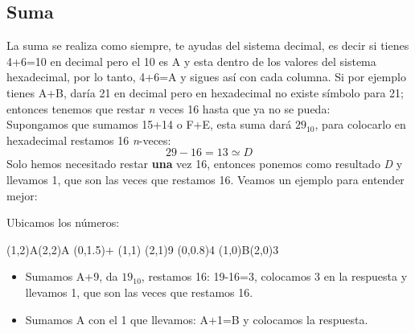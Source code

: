 \documentclass[
	12pt, %
	fleqn, %
	a4paper, %
]{LegrandOrangeBook}
\begin{document}
\subsection{Suma}
La suma se realiza como siempre, te ayudas del sistema decimal, es decir si tienes 4+6=10 en decimal pero el 10 es A y esta dentro de los valores del sistema hexadecimal, por lo tanto, 4+6=A y sigues así con cada columna. Si por ejemplo tienes  A+B, daría 21 en decimal pero en hexadecimal no existe símbolo para 21; entonces tenemos que restar \textit{n} veces 16 hasta que ya no se pueda:\\
Supongamos que sumamos 15+14 o F+E, esta suma dará $29_{10}$, para colocarlo en hexadecimal restamos 16 \textit{n}-veces:
\begin{displaymath}
29-16=13\simeq D
\end{displaymath}
Solo hemos necesitado restar \textbf{una} vez 16, entonces ponemos como resultado \textit{D} y llevamos 1, que son las veces que restamos 16. Veamos un ejemplo para entender mejor:
\begin{example}
Ubicamos los números:
\begin{center}
\par\vspace{2\oplineheight}
\oplput(1,2){A}\oplput(2,2){A}
\oplput(0,1.5){$+$}
\oplput(1,1){ }\oplput(2,1){9}
\ophline(0,0.8){4}
\oplput(1,0){B}\oplput(2,0){3}
\end{center}
\begin{itemize}
\item Sumamos A+9, da $19_{10}$, restamos 16: 19-16=3, colocamos 3 en la respuesta y llevamos 1, que son las veces que restamos 16.
\item Sumamos A con el 1 que llevamos: A+1=B y colocamos la respuesta.
\end{itemize}
\end{example}
\end{document}
